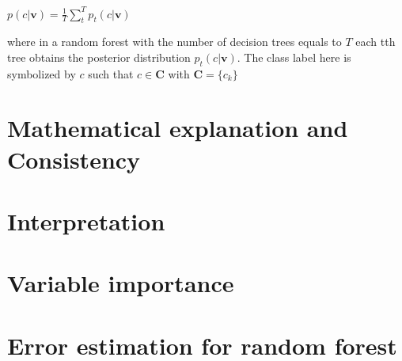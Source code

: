 \begin{center}
$p(c|\textbf{v}) =  \frac{1}{T} \displaystyle\sum_{t}^{T} p_{t}(c|\textbf{v})$
\end{center}

where in a random forest with the number of decision trees equals to $T$ each tth tree obtains the posterior distribution $ p_{t}(c|\textbf{v})$. The class label here is symbolized by $c$ such that $c \in \textbf{C}$ with $ \textbf{C} = \{ c_{k}\} $



\section{Mathematical explanation and Consistency}


\section{Interpretation}


\section{Variable importance}

\section{Error estimation for random forest}


